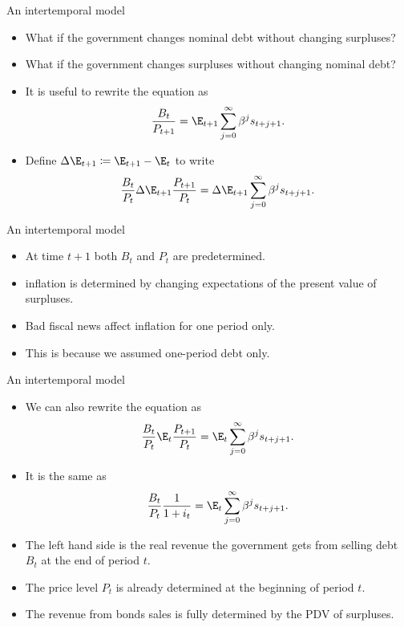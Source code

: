 \documentclass[11pt,xcolor={dvipsnames},aspectratio=159,hyperref={pdftex,pdfpagemode=UseNone,hidelinks,pdfdisplaydoctitle=true},usepdftitle=false]{beamer}
\begin{document}
\begin{frame}{An intertemporal model}
    \begin{itemize}
            \item What if the government changes nominal debt without changing surpluses?
            \item What if the government changes surpluses without changing nominal debt?
            \item It is useful to rewrite the equation as \begin{align*}
                \frac{B_{t}}{P_{t+1}}  = \E_{t+1} \sum_{j=0}^\infty \beta^j s_{t+j+1}.
                \end{align*}
            \item Define $\Delta\E_{t+1} \coloneq \E_{t+1} - \E_{t}$ to write \begin{align*}
                \frac{B_{t}}{P_{t}} \Delta\E_{t+1}\frac{P_{t+1}}{P_t}  = \Delta\E_{t+1} \sum_{j=0}^\infty \beta^j s_{t+j+1}.
                \end{align*}
        \end{itemize}
    \end{frame}

\begin{frame}{An intertemporal model}
    \begin{itemize}
            \item At time $t+1$ both $B_t$ and $P_t$ are predetermined. 
            \item {} inflation is determined by changing expectations of the present value of surpluses.
            \item Bad fiscal news affect inflation for one period only. 
            \item This is because we assumed one-period debt only.
        \end{itemize}
    \end{frame}

\begin{frame}{An intertemporal model}
    \begin{itemize}
            \item We can also rewrite the equation as \begin{align*}
                \frac{B_{t}}{P_{t}} \E_{t}\frac{P_{t+1}}{P_t}  = \E_{t} \sum_{j=0}^\infty \beta^j s_{t+j+1}.
                \end{align*}
            \item It is the same as \begin{align*}
                \frac{B_{t}}{P_{t}} \frac{1}{1+i_t}  = \E_{t} \sum_{j=0}^\infty \beta^j s_{t+j+1}.
                \end{align*}
            \item The left hand side is the real revenue the government gets from selling debt $B_t$ at the end of period $t$.
            \item The price level $P_t$ is already determined at the beginning of period $t$.
            \item The revenue from bonds sales is fully determined by the PDV of surpluses. 
        \end{itemize}
    \end{frame}    
\end{document}
